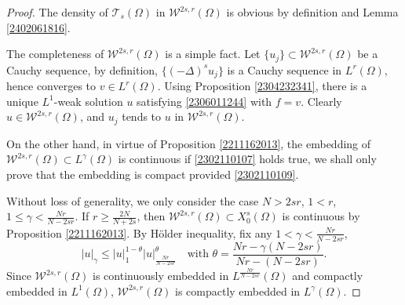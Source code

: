 \documentclass[10pt,a4paper]{amsart}
\begin{document}
\begin{proof}
The density of $\mathcal{T}_s(\Omega)$ in $\mathcal{W}^{2s, r}(\Omega)$ is obvious by definition and Lemma \ref{2402061816}. 

The completeness of $\mathcal{W}^{2s, r}(\Omega)$ is a simple fact. Let $\{u_j\}\subset \mathcal{W}^{2s, r}(\Omega)$ be a Cauchy sequence, by definition, $\{(-\Delta)^s u_j\}$ is a Cauchy sequence in $L^r({\Omega})$, hence converges to $v\in L^r({\Omega})$. Using Proposition \ref{2304232341}, there is a unique $L^1$-weak solution $u$ satisfying \eqref{2306011244} with $f = v$. Clearly $u \in \mathcal{W}^{2s, r}(\Omega)$, and $u_j$ tends to $u$ in $\mathcal{W}^{2s, r}(\Omega)$.

On the other hand, in virtue of Proposition \ref{2211162013}, the embedding of $\mathcal{W}^{2s, r}(\Omega)\subset L^\gamma(\Omega)$ is continuous if \eqref{2302110107} holds true, we shall only prove that the embedding is compact provided \eqref{2302110109}.

Without loss of generality, we only consider the case $N>2sr$, $1 < r$, $1 \le\gamma<\frac{Nr}{N-2sr}$. If $r\ge \frac{2N}{N+2s}$, then $\mathcal{W}^{2s, r}(\Omega)\subset X_0^s(\Omega)$ is continuous by Proposition \ref{2211162013}. By H\"older inequality, fix any $1 < \gamma<\frac{Nr}{N-2sr}$,
\begin{equation}\label{2302111630}
|u|_{{\gamma}}\le |u|^{1-\theta}_{{1}}|u|^{\theta}_{{\frac{Nr}{N-2sr}}} \quad \mbox{with } \theta=\frac{Nr-\gamma (N-2sr)}{Nr-(N-2sr)}.
\end{equation}
Since $\mathcal{W}^{2s, r}(\Omega)$ is continuously embedded in $L^{\frac{Nr}{N-2sr}}(\Omega)$ and compactly embedded  in $L^1(\Omega)$, $\mathcal{W}^{2s, r}(\Omega)$ is compactly embedded in $L^{\gamma}(\Omega)$.


\end{proof}
\end{document}
